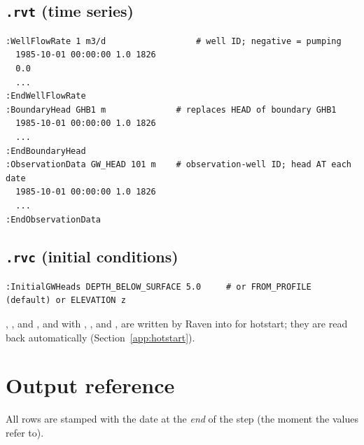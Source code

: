 \subsection{\texttt{.rvt} (time series)}
\begin{lstlisting}
:WellFlowRate 1 m3/d                  # well ID; negative = pumping
  1985-10-01 00:00:00 1.0 1826
  0.0
  ...
:EndWellFlowRate
:BoundaryHead GHB1 m              # replaces HEAD of boundary GHB1
  1985-10-01 00:00:00 1.0 1826
  ...
:EndBoundaryHead
:ObservationData GW_HEAD 101 m    # observation-well ID; head AT each date
  1985-10-01 00:00:00 1.0 1826
  ...
:EndObservationData
\end{lstlisting}

\subsection{\texttt{.rvc} (initial conditions)}
\par\noindent\begin{minipage}{\linewidth}
\begin{lstlisting}
:InitialGWHeads DEPTH_BELOW_SURFACE 5.0     # or FROM_PROFILE (default) or ELEVATION z
\end{lstlisting}
\end{minipage}\par\smallskip
{}, ,  and , and with
 , ,  and ,
are written by Raven into  for hotstart; they are read back automatically (Section~\ref{app:hotstart}).

\section{Output reference}\label{ch:outputs}
All rows are stamped with the date at the \emph{end} of the step (the moment the values refer to).
